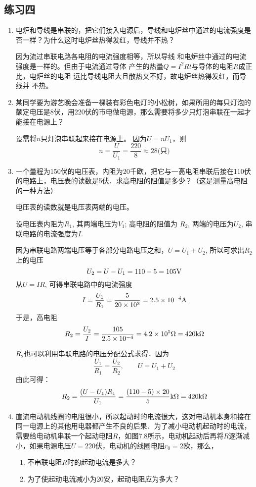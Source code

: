 \subsection{练习四}
\begin{enumerate}
    \item 电炉和导线是串联的，把它们接入电源后，导线和电炉丝中通过的电流强度是否一样？为什么这时电炉丝热得发红，导线并不热？

    \begin{solution}
因为流过串联电路各电阻的电流强度相等，所以导线
和电炉丝中通过的电流强度是一样的。但由于电流通过导体
产生的热量$Q=I^2Rt$与导体的电阻$R$成正比，电炉丝的电阻
远比导线电阻大且散热又不好，故电炉丝热得发红，而导线并
不热。    
    \end{solution}
    \item 某同学要为游艺晚会准备一棵装有彩色电灯的小松树，如果所用的每只灯泡的额定电压是8伏，用220伏的市电做电源，那么需要将多少只灯泡串联在一起才能接在电源上？

    \begin{solution}
 设需将$n$只灯泡串联起来接在电源上。
因为$U=nU_1$，则
\[n=\frac{U}{U_1}=\frac{220}{8}\approx 28\text{(只)}\]   
    \end{solution}
    \item 一个量程为150伏的电压表，内阻为20千欧，把它与一高电阻串联后接在110伏的电路上，电压表的读数是5伏．求高电阻的阻值是多少？（这是测量高电阻的一种方法）

    \begin{solution}
电压表的读数就是电压表两端的电压。

设电压表内阻为$R_1$, 其两端电压为$V_1$; 高电阻的阻值为
$R_2$, 两端的电压为$U_2$, 串联电路的电流强度为$I$.

因为串联电路两端电压等于各部分电路电压之和，$U=
U_1+U_2$, 所以可求出$R_2$上的电压
\[U_2=U-U_1=110-5=105{\rm V}\]
从$U=IR$, 可得串联电路中的电流强度
\[I=\frac{U_1}{R_1}=\frac{5}{20\times10^3}=2.5\times 10^{-4}{\rm A}\]
于是，高电阻
    \[R_2=\frac{U_2}{I}=\frac{105}{2.5\times 10^{-4}}=4.2\times 10^{5}\Omega=420{\rm k}\Omega\]

    $R_2$也可以利用串联电路的电压分配公式求得．因为
\[\frac{U_1}{R_1}=\frac{U_2}{R_2},\qquad U=U_1+U_2\]
由此可得：
\[R_2=\frac{(U-U_1)R_1}{U_1}=\frac{(110-5)\times 20}{5}{\rm k}\Omega=420{\rm k}\Omega\]
    \end{solution}
    \item 直流电动机线圈的电阻很小，所以起动时的电流很大，这对电动机本身和接在同一电源上的其他用电器都产生不良的后果．为了减小电动机起动时的电流，需要给电动机串联一个起动电阻$R$，如图7.8所示，电动机起动后再将$R$逐渐减小，如果电源电压$U=220$伏，电动机的线圈电阻$r_0=2$欧，那么，
    \begin{enumerate}
        \item 不串联电阻$R$时的起动电流是多大？
        \item 为了使起动电流减小为20安，起动电阻应为多大？
    \end{enumerate}


\end{enumerate}
